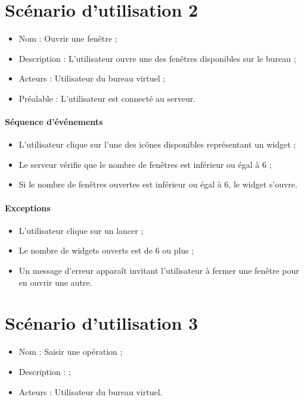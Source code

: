 
\section{Scénario d'utilisation 2}
\begin{itemize}
	\item Nom : Ouvrir une fenêtre ;
	\item Description : L'utilisateur ouvre une des fenêtres disponibles sur le bureau ;
	\item Acteurs : Utilisateur du bureau virtuel ;
	\item Préalable : L'utilisateur est connecté au serveur.
\end{itemize}

\paragraph{Séquence d'événements}
\begin{itemize}
	\item L'utilisateur clique sur l'une des icônes disponibles représentant un widget ;
	\item Le serveur vérifie que le nombre de fenêtres est inférieur ou égal à 6 ;
	\item Si le nombre de fenêtres ouvertes est inférieur ou égal à 6, le widget s'ouvre.
\end{itemize}

\paragraph{Exceptions}
\begin{itemize}
	\item L'utilisateur clique sur un lancer ;
	\item Le nombre de widgets ouverts est de 6 ou plus ;
	\item Un message d'erreur apparaît invitant l'utilisateur à fermer une fenêtre pour en ouvrir une autre.
\end{itemize}


\section{Scénario d'utilisation 3}
\begin{itemize}
	\item Nom : Saisir une opération ;
	\item Description :  ;
	\item Acteurs : Utilisateur du bureau virtuel.
\end{itemize}

